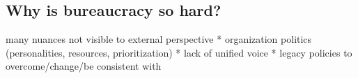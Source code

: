 \subsection{Why is bureaucracy so hard?}
many nuances not visible to external perspective
   * organization politics (personalities, resources, prioritization)
   * lack of unified voice
   * legacy policies to overcome/change/be consistent with
